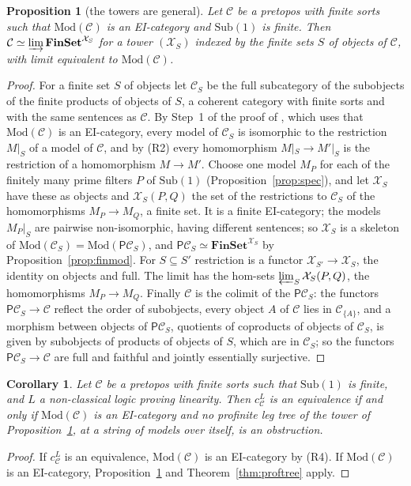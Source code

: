\documentclass[11pt]{amsart}
\newtheorem{cor}[thm]{Corollary}
\newtheorem{prop}[thm]{Proposition}
\theoremstyle{definition}
\newcommand{\Fin}{\mathbf{FinSet}}
\newcommand{\Sub}{\mathrm{Sub}}
\newcommand{\Mod}{\mathrm{Mod}}
\newcommand{\PP}{\mathsf P}
\newcommand{\cX}{\mathcal X}
\newcommand{\cC}{\mathcal C}
\begin{document}
\begin{prop}[the towers are general]\label{prop:general}
Let $\cC$ be a pretopos with finite sorts such that $\Mod(\cC)$ is an
EI-category and $\Sub(1)$ is finite. Then $\cC\simeq\varinjlim
\Fin^{\cX_S}$ for a tower $(\cX_S)$ indexed by the finite sets $S$ of
objects of $\cC$, with limit equivalent to $\Mod(\cC)$.
\end{prop}
\begin{proof}
For a finite set $S$ of objects let $\cC_S$ be the full subcategory of
the subobjects of the finite products of objects of $S$, a coherent
category with finite sorts and with the same sentences as $\cC$. By
Step~1 of the proof of \cite[Prop.~5.4]{Finsorts}, which uses that
$\Mod(\cC)$ is an EI-category, every model of $\cC_S$ is isomorphic to the restriction
$M|_S$ of a model of $\cC$, and by (R2) every homomorphism $M|_S\to
M'|_S$ is the restriction of a homomorphism $M\to M'$. Choose one
model $M_P$ for each of the finitely many prime filters $P$ of
$\Sub(1)$ (Proposition~\ref{prop:spec}), and let $\cX_S$ have these as
objects and $\cX_S(P,Q)$ the set of the restrictions to $\cC_S$ of the
homomorphisms $M_P\to M_Q$, a finite set. It is a finite EI-category;
the models $M_P|_S$ are pairwise non-isomorphic, having different
sentences; so $\cX_S$ is a skeleton of $\Mod(\cC_S)=\Mod(\PP\cC_S)$,
and $\PP\cC_S\simeq\Fin^{\cX_S}$ by Proposition~\ref{prop:finmod}. For
$S\subseteq S'$ restriction is a functor $\cX_{S'}\to\cX_S$, the
identity on objects and full. The limit has the hom-sets $\varprojlim_S
\cX_S(P,Q)$, the homomorphisms $M_P\to M_Q$. Finally $\cC$ is the
colimit of the $\PP\cC_S$: the functors $\PP\cC_S\to\cC$ reflect the
order of subobjects, every object $A$ of $\cC$ lies in $\cC_{\{A\}}$,
and a morphism between objects of $\PP\cC_S$, quotients of coproducts
of objects of $\cC_S$, is given by subobjects of products of objects
of $S$, which are in $\cC_S$; so the functors $\PP\cC_S\to\cC$ are
full and faithful and jointly essentially surjective.
\end{proof}


\begin{cor}\label{cor:A}
Let $\cC$ be a pretopos with finite sorts such that $\Sub(1)$ is
finite, and $L$ a non-classical logic proving linearity. Then $c^L_\cC$ is an equivalence if and only if $\Mod(\cC)$ is
an EI-category and no profinite leg tree of the tower of
Proposition~\ref{prop:general}, at a string of models over itself, is
an obstruction.
\end{cor}
\begin{proof}
If $c^L_\cC$ is an equivalence, $\Mod(\cC)$ is an EI-category by (R4).
If $\Mod(\cC)$ is an EI-category, Proposition~\ref{prop:general} and
Theorem~\ref{thm:proftree} apply.
\end{proof}
\end{document}
